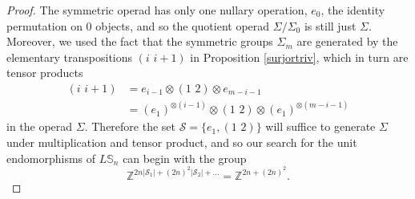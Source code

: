 \documentclass{amsbook} %
\newcommand{\trans}[2]{( #1 \, \, #2 )}
\numberwithin{section}{chapter}
\begin{document}
\begin{proof}
The symmetric operad has only one nullary operation, $e_0$, the identity permutation on 0 objects, and so the quotient operad $\Sigma/\Sigma_0$ is still just $\Sigma$. Moreover, we used the fact that the symmetric groups $\Sigma_m$ are generated by the elementary transpositions $\trans{i}{i+1}$ in Proposition \ref{surjortriv}, which in turn are tensor products
  \begin{align*}
		\trans{i}{i+1} &= e_{i-1} \otimes \trans{1}{2} \otimes e_{m-i-1} \\
  	& = (e_1)^{\otimes (i-1)} \otimes \trans{1}{2} \otimes (e_1)^{\otimes (m-i-1)}
  \end{align*}
in the operad $\Sigma$. Therefore the set $\mathcal{S} = \{ e_1, \trans{1}{2} \}$ will suffice to generate $\Sigma$ under multiplication and tensor product, and so our search for the unit endomorphisms of $L\mathbb{S}_n$ can begin with the group
  \[
    \mathbb{Z}^{2n|\mathcal{S}_1| + (2n)^2|\mathcal{S}_2| + \ldots} = \mathbb{Z}^{2n + (2n)^2}.
  \]


\end{proof}
\end{document}
